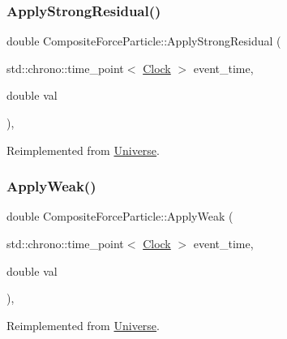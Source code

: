 \subsubsection{\texorpdfstring{Apply\+Strong\+Residual()}{ApplyStrongResidual()}}
{\footnotesize\ttfamily double Composite\+Force\+Particle\+::\+Apply\+Strong\+Residual (\begin{DoxyParamCaption}\item[{std\+::chrono\+::time\+\_\+point$<$ \mbox{\hyperlink{universe_8h_a0ef8d951d1ca5ab3cfaf7ab4c7a6fd80}{Clock}} $>$}]{event\+\_\+time,  }\item[{double}]{val }\end{DoxyParamCaption})\hspace{0.3cm}{\ttfamily [inline]}, {\ttfamily [virtual]}}



Reimplemented from \mbox{\hyperlink{classUniverse_af7becebb347be9a85541d96a3eca1ca7}{Universe}}.

\mbox{\label{classCompositeForceParticle_a1fd171a0c6fab0cbf9a45a0d24607bde}} 
\subsubsection{\texorpdfstring{Apply\+Weak()}{ApplyWeak()}}
{\footnotesize\ttfamily double Composite\+Force\+Particle\+::\+Apply\+Weak (\begin{DoxyParamCaption}\item[{std\+::chrono\+::time\+\_\+point$<$ \mbox{\hyperlink{universe_8h_a0ef8d951d1ca5ab3cfaf7ab4c7a6fd80}{Clock}} $>$}]{event\+\_\+time,  }\item[{double}]{val }\end{DoxyParamCaption})\hspace{0.3cm}{\ttfamily [inline]}, {\ttfamily [virtual]}}



Reimplemented from \mbox{\hyperlink{classUniverse_a6d1226b3adec3c42a833afdbb6a65a92}{Universe}}.

\mbox{\label{classCompositeForceParticle_a3c1c0b427c633f0685f1d812e02b92ff}} 
